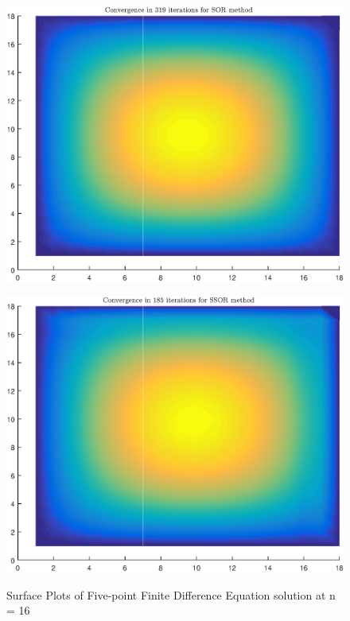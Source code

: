 \documentclass[11pt]{article}
\begin{document}
\begin{figure}
\\
\begin{minipage}{.45\textwidth}
\centering
\includegraphics[width=\linewidth]{math609_pa2_comp_example_2_16_n_SOR.eps}
\label{fig:test3}
\end{minipage}\hfill
\begin{minipage}{.45\textwidth}
\centering
\includegraphics[width=\linewidth]{math609_pa2_comp_example_2_16_n_SSOR.eps}
\label{fig:test3}
\end{minipage}\hfill
\caption{Surface Plots of Five-point Finite Difference Equation solution at n = 16}
\end{figure}
\end{document}

